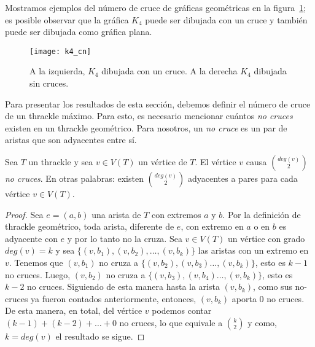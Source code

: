     Mostramos ejemplos del número de cruce de gráficas geométricas en la
    figura~\ref{fig:k4_cn}; es posible observar que la gráfica $K_4$ puede ser dibujada con
    un cruce y también puede ser dibujada como gráfica plana.
    \begin{figure}[h]
      \centering
      \texttt{[image: k4\_cn]}
      \caption{A la izquierda, $K_4$ dibujada con un cruce. A la derecha $K_4$ dibujada sin
      cruces.}
      \label{fig:k4_cn}
    \end{figure}

    Para presentar los resultados de esta sección, debemos definir el número de cruce de un thrackle
    máximo. Para esto, es necesario mencionar cuántos \emph{no cruces} existen en un thrackle
    geométrico. Para nosotros, un \emph{no cruce} es un par de aristas que son adyacentes
    entre sí.

    \begin{lemma} \label{lema:nocruces}
      Sea $T$ un thrackle y sea $v\in V(T)$ un vértice de $T$. El vértice $v$ causa $\binom{deg(v)}{2}$ \emph{no cruces}. En otras palabras: existen $\binom{deg(v)}{2}$ adyacentes a pares para cada vértice $v\in V(T)$.
    \end{lemma}
    \begin{proof}
      Sea $e=(a,b)$ una arista de $T$ con extremos $a$ y $b$. Por la definición de thrackle
      geométrico, toda arista, diferente de $e$, con extremo en $a$ o en $b$ es adyacente con
      $e$ y por lo tanto no la cruza. Sea $v\in V(T)$ un vértice con grado $deg(v)=k$ y sea
      $\{(v,b_1),(v,b_2),\dots,(v,b_k)\}$ las aristas con un extremo en $v$. Tenemos que
      $(v,b_1)$ no cruza a $\{(v,b_2),(v,b_3)\dots,(v,b_k)\}$, esto es $k-1$ no cruces.
      Luego, $(v,b_2)$ no cruza a $\{(v,b_3),(v,b_4)\dots,(v,b_k)\}$, esto es $k-2$ no cruces. Siguiendo de esta manera hasta la arista $(v,b_k)$, como sus no-cruces ya fueron contados anteriormente, entonces, $(v,b_k)$ aporta 0 no cruces. De esta manera, en total, del vértice $v$ podemos contar $(k-1)+(k-2)+\dots+0$ no cruces, lo que equivale a $\binom{k}{2}$ y como, $k=deg(v)$ el resultado se sigue.
    \end{proof}

